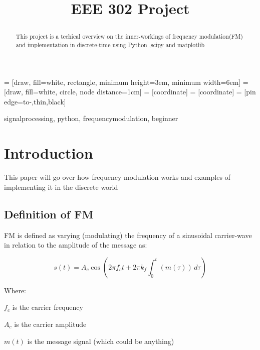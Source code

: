 \documentclass[conference]{IEEEtran}
\begin{document}
 = [draw, fill=white, rectangle, 
    minimum height=3em, minimum width=6em]
 = [draw, fill=white, circle, node distance=1cm]
 = [coordinate]
 = [coordinate]
 = [pin edge={to-,thin,black}]

\title{EEE 302 Project\\
    \author{
    }
}
\maketitle

\begin{abstract}
    This project is a techical overview on the inner-workings of frequency modulation(FM) and implementation in discrete-time using Python ,scipy and matplotlib
\end{abstract}

\begin{IEEEkeywords}
    signalprocessing, python, frequencymodulation, beginner
\end{IEEEkeywords}

\section{Introduction}

This paper will go over how frequency modulation works and examples of implementing it in the discrete world

\subsection{Definition of FM}

FM is defined as varying (modulating) the frequency of a sinusoidal carrier-wave in relation to the amplitude of the message as:


\begin{equation}
    s(t) = A_c\cos{(2 \pi f_c t + 2\pi k_f \int_{0}^{t}(m(\tau)) \,d\tau)}
\end{equation}


Where:

$f_c$ is the carrier frequency

$A_c$ is the carrier amplitude

$m(t)$ is the message signal (which could be anything)
\end{document}
